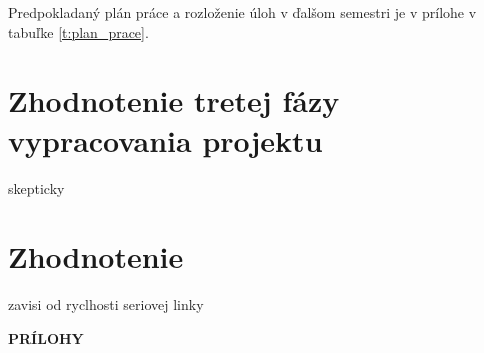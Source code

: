 \documentclass[12pt,a4wide,oneside,openright]{report}
\begin{document}
Predpokladaný plán práce a rozloženie úloh v ďalšom semestri je v prílohe v tabuľke \ref{t:plan_prace}.


\section{Zhodnotenie tretej fázy vypracovania projektu}
skepticky
\section{Zhodnotenie}
zavisi od ryclhosti seriovej linky

\clearpage
{}
{}



\newpage
\thispagestyle{empty}
\vspace*{10cm}
\hspace*{5cm}
\textbf{\LARGE{PRÍLOHY}}

\addappheadtotoc
\def\appendixname{}
\appendix

\newpage
{}
\end{document}
